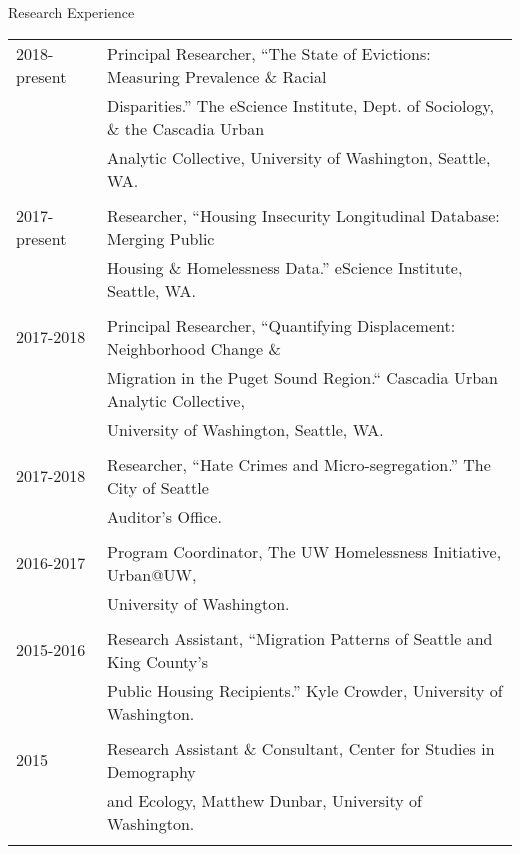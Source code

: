 \documentclass{resume} %
\begin{document}
\begin{rSection}{Research Experience}
\vspace{5mm}
\begin{tabular}{ @{} >{}l @{\hspace{6ex}} l }

2018-present	& Principal Researcher, ``The State of Evictions: Measuring Prevalence \& Racial\\
				& Disparities.'' The eScience Institute, Dept. of Sociology, \& the Cascadia Urban\\
				& Analytic Collective, University of Washington, Seattle, WA.\\\\

2017-present	& Researcher, ``Housing Insecurity Longitudinal Database: Merging Public\\
			& Housing \& Homelessness Data.'' eScience Institute, Seattle, WA.\\\\

2017-2018	& Principal Researcher, ``Quantifying Displacement: Neighborhood Change \&\\
				& Migration in the Puget Sound Region.`` Cascadia Urban Analytic Collective,\\
				& University of Washington, Seattle, WA.\\\\

2017-2018	& Researcher, ``Hate Crimes and Micro-segregation.'' The City of Seattle\\
			& Auditor's Office.\\\\

2016-2017	& Program Coordinator, The UW Homelessness Initiative, Urban@UW,\\
			& University of Washington.\\\\

2015-2016	& Research Assistant, ``Migration Patterns of Seattle and King County's\\
			& Public Housing Recipients.'' Kyle Crowder, University of Washington.\\\\

2015		& Research Assistant \& Consultant, Center for Studies in Demography\\
			& and Ecology, Matthew Dunbar, University of Washington.\\\\


\end{tabular}
\end{rSection}
\end{document}
